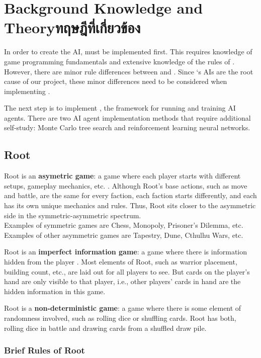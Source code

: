 \chapter{\ifenglish Background Knowledge and Theory\else ทฤษฎีที่เกี่ยวข้อง\fi}

In order to create the AI, \RootOurs{} must be implemented first. This requires knowledge of game programming fundamentals and extensive knowledge of the rules of \RootB{}. However, there are minor rule differences between \RootV{} and \RootB{}. Since \RootV{}`s AIs are the root cause of our project, these minor differences need to be considered when implementing \RootOurs{}.

The next step is to implement \RootAI{}, the framework for running \RootOurs{} and training AI agents. There are two AI agent implementation methods that require additional self-study: Monte Carlo tree search and reinforcement learning neural networks.

\section{Root}
Root is an \textbf{asymetric game}: a game where each player starts with different setups, gameplay mechanics, etc. \cite{Mike_Shor-2023-10-06}. Although Root's base actions, such as move and battle, are the same for every faction, each faction starts differently, and each has its own unique mechanics and rules. Thus, Root sits closer to the asymmetric side in the symmetric-asymmetric spectrum. \\
Examples of symmetric games are Chess, Monopoly, Prisoner's Dilemma, etc.\\
Examples of other asymmetric games are Tapestry, Dune, Cthulhu Wars, etc.

Root is an \textbf{imperfect information game}: a game where there is information hidden from the player \cite{osborne1994course}. Most elements of Root, such as warrior placement, building count, etc., are laid out for all players to see. But cards on the player's hand are only visible to that player, i.e., other players' cards in hand are the hidden information in this game.

Root is a \textbf{non-deterministic game}: a game where there is some element of randomness involved, such as rolling dice or shuffling cards. Root has both, rolling dice in battle and drawing cards from a shuffled draw pile.

\subsection{Brief Rules of Root} \label{brief-rules-of-root}

